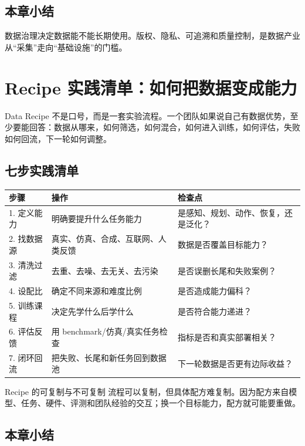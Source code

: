 \documentclass[a4paper]{article}
\begin{document}
\subsection{本章小结}

数据治理决定数据能不能长期使用。版权、隐私、可追溯和质量控制，是数据产业从“采集”走向“基础设施”的门槛。

\section{Recipe 实践清单：如何把数据变成能力}

Data Recipe 不是口号，而是一套实验流程。一个团队如果说自己有数据优势，至少要能回答：数据从哪来，如何筛选，如何混合，如何进入训练，如何评估，失败如何回流，下一轮如何调整。

\subsection{七步实践清单}

\noindent\begin{longtable}{p{}p{}p{}}
\toprule
步骤 & 操作 & 检查点 \\
\midrule
1. 定义能力 & 明确要提升什么任务能力 & 是感知、规划、动作、恢复，还是泛化？ \\
2. 找数据源 & 真实、仿真、合成、互联网、人类反馈 & 数据是否覆盖目标能力？ \\
3. 清洗过滤 & 去重、去噪、去无关、去污染 & 是否误删长尾和失败案例？ \\
4. 设配比 & 确定不同来源和难度比例 & 是否造成能力偏科？ \\
5. 训练课程 & 决定先学什么后学什么 & 是否符合能力递进？ \\
6. 评估反馈 & 用 benchmark/仿真/真实任务检查 & 指标是否和真实部署相关？ \\
7. 闭环回流 & 把失败、长尾和新任务回到数据池 & 下一轮数据是否更有边际收益？ \\
\bottomrule
\end{longtable}

\begin{knowledgebox}{Recipe 的可复制与不可复制}
流程可以复制，但具体配方难复制。因为配方来自模型、任务、硬件、评测和团队经验的交互；换一个目标能力，配方就可能要重做。
\end{knowledgebox}

\subsection{本章小结}
\end{document}
